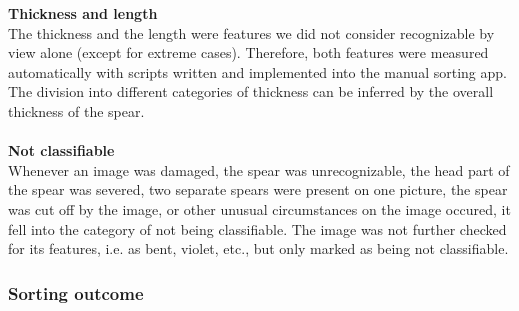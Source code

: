 \textbf{Thickness and length} \\
The thickness and the length were features we did not consider recognizable by view alone (except for extreme cases). Therefore, both features were measured automatically with scripts written and implemented into the manual sorting app. The division into different categories of thickness can be inferred by the overall thickness of the spear.\\
 \\
\textbf{Not classifiable} \\
Whenever an image was damaged, the spear was unrecognizable, the head part of the spear was severed, two separate spears were present on one picture, the spear was cut off by the image, or other unusual circumstances on the image occured, it fell into the category of not being classifiable. The image was not further checked for its features, i.e. as bent, violet, etc., but only marked as being not classifiable.



\subsubsection{Sorting outcome}

